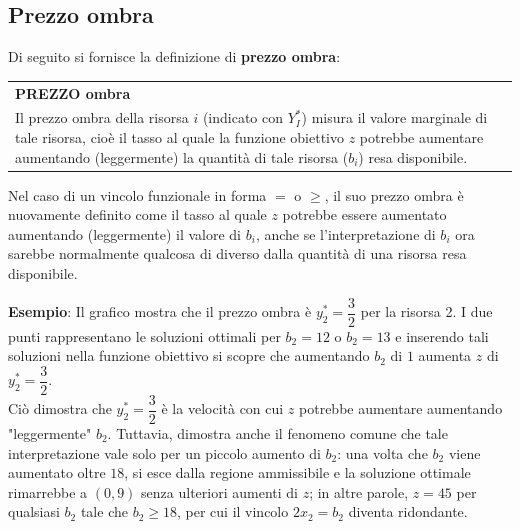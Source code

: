 \documentclass[a4paper]{extarticle}
\renewcommand\arraystretch{}
\begin{document}
\vspace{1em}
\noindent
\subsection{Prezzo ombra}
Di seguito si fornisce la definizione di \textbf{prezzo ombra}:

\vspace{1em}
\setlength{\tabcolsep}{14pt}
\renewcommand{\arraystretch}{2}
\noindent
\begin{tabularx}{\textwidth}{@{}|P|@{}}
    \hline
    {\textbf{PREZZO ombra}}\\
    \parbox{\linewidth}{Il prezzo ombra della risorsa $i$ (indicato con $Y_I^*$) misura il valore marginale di tale risorsa, cioè il tasso al quale la funzione obiettivo $z$ potrebbe aumentare aumentando (leggermente) la quantità di tale risorsa ($b_i$) resa disponibile.\vspace{3mm}}\\
    \hline
\end{tabularx}

\vspace{1em}
\noindent
Nel caso di un vincolo funzionale in forma $=$ o $\geq$, il suo prezzo ombra è nuovamente definito come il tasso al quale $z$ potrebbe essere aumentato aumentando (leggermente) il valore di $b_i$, anche se l'interpretazione di $b_i$ ora sarebbe normalmente qualcosa di diverso dalla quantità di una risorsa resa disponibile.

\vspace{2em}
\noindent
\textbf{Esempio}: Il grafico mostra che il prezzo ombra è $y_2^* = \dfrac{3}{2}$ per la risorsa 2. I due punti rappresentano le soluzioni ottimali per $b_2 = 12$ o $b_2 = 13$ e inserendo tali soluzioni nella funzione obiettivo si scopre che aumentando $b_2$ di $1$ aumenta $z$ di $y_2^* = \dfrac{3}{2}$.\\
Ciò dimostra che $y_2^* = \dfrac{3}{2}$ è la velocità con cui $z$ potrebbe aumentare aumentando "leggermente" $b_2$. Tuttavia, dimostra anche il fenomeno comune che tale interpretazione vale solo per un piccolo aumento di $b_2$: una volta che $b_2$ viene aumentato oltre $18$, si esce dalla regione ammissibile e la soluzione ottimale rimarrebbe a $(0,9)$ senza ulteriori aumenti di $z$; in altre parole, $z=45$ per qualsiasi $b_2$ tale che $b_2 \geq 18$, per cui il vincolo $2x_2 = b_2$ diventa ridondante.
\end{document}
